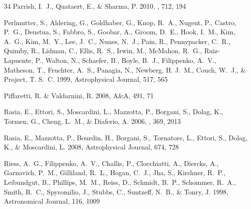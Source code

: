 \documentclass[12pt,preprint]{aastex}
\begin{document}
\begin{thebibliography}{34}
{Parrish}, I.~J., {Quataert}, E., \& {Sharma}, P. 2010, \apj, 712, 194

Perlmutter, S., Aldering, G., Goldhaber, G., Knop, R.~A., Nugent, P., Castro,
  P.~G., Deustua, S., Fabbro, S., Goobar, A., Groom, D.~E., Hook, I.~M., Kim,
  A.~G., Kim, M.~Y., Lee, J.~C., Nunes, N.~J., Pain, R., Pennypacker, C.~R.,
  Quimby, R., Lidman, C., Ellis, R.~S., Irwin, M., {McMahon}, R.~G.,
  {Ruiz-Lapuente}, P., Walton, N., Schaefer, B., Boyle, B.~J., Filippenko,
  A.~V., Matheson, T., Fruchter, A.~S., Panagia, N., Newberg, H. J.~M., Couch,
  W.~J., \& Project, T. S.~C. 1999, Astrophysical Journal, 517, 565

Piffaretti, R. \& Valdarnini, R. 2008, A\&A, 491, 71

{Rasia}, E., {Ettori}, S., {Moscardini}, L., {Mazzotta}, P., {Borgani}, S.,
  {Dolag}, K., {Tormen}, G., {Cheng}, L.~M., \& {Diaferio}, A. 2006, \mnras,
  369, 2013

Rasia, E., Mazzotta, P., Bourdin, H., Borgani, S., Tornatore, L., Ettori, S.,
  Dolag, K., \& Moscardini, L. 2008, Astrophysical Journal, 674, 728

Riess, A.~G., Filippenko, A.~V., Challis, P., Clocchiatti, A., Diercks, A.,
  Garnavich, P.~M., Gilliland, R.~L., Hogan, C.~J., Jha, S., Kirshner, R.~P.,
  Leibundgut, B., Phillips, M.~M., Reiss, D., Schmidt, B.~P., Schommer, R.~A.,
  Smith, R.~C., Spyromilio, J., Stubbs, C., Suntzeff, N.~B., \& Tonry, J. 1998,
  Astronomical Journal, 116, 1009


\end{thebibliography}
\end{document}
